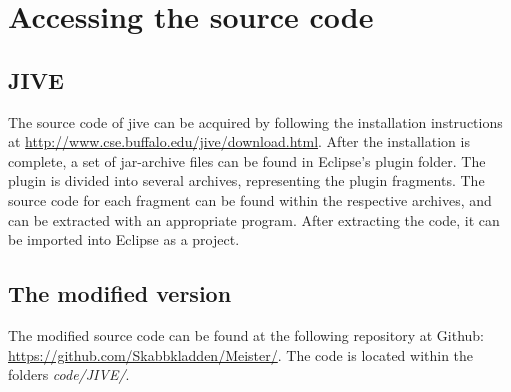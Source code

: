 \chapter{Accessing the source code}\label{appSrc}
\section{JIVE}\label{appSrcJive}
The source code of \gls{jive} can be acquired by following the installation instructions at \url{http://www.cse.buffalo.edu/jive/download.html}.
After the installation is complete, a set of jar-archive files can be found in Eclipse's plugin folder.
The plugin is divided into several archives, representing the plugin fragments.
The source code for each fragment can be found within the respective archives, and can be extracted with an appropriate program.
After extracting the code, it can be imported into Eclipse as a project.

\section{The modified version}\label{appSrcJiveMod}
The modified source code can be found at the following repository at Github: \url{https://github.com/Skabbkladden/Meister/}.
The code is located within the folders \emph{code/JIVE/}.